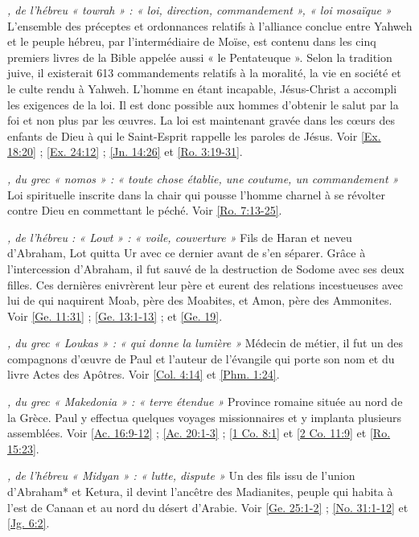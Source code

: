 \begin{multicols}{2}
\textit{, de l'hébreu « towrah » : « loi, direction, commandement », « loi mosaïque »}\newline
L'ensemble des préceptes et ordonnances relatifs à l'alliance conclue entre Yahweh et le peuple hébreu, par l'intermédiaire de Moïse, est contenu dans les cinq premiers livres de la Bible appelée aussi « le Pentateuque ». Selon la tradition juive, il existerait 613 commandements relatifs à la moralité, la vie en société et le culte rendu à Yahweh. L'homme en étant incapable, Jésus-Christ a accompli les exigences de la loi. Il est donc possible aux hommes d'obtenir le salut par la foi et non plus par les œuvres. La loi est maintenant gravée dans les cœurs des enfants de Dieu à qui le Saint-Esprit rappelle les paroles de Jésus. Voir \vref{Ex. 18:20} ; \vref{Ex. 24:12} ; \vref{Jn. 14:26} et \vref{Ro. 3:19-31}.

\textit{, du grec « nomos » : « toute chose établie, une coutume, un commandement »}\newline
Loi spirituelle inscrite dans la chair qui pousse l'homme charnel à se révolter contre Dieu en commettant le péché. Voir \vref{Ro. 7:13-25}.

\textit{, de l'hébreu : « Lowt » : « voile, couverture »}\newline
Fils de Haran et neveu d'Abraham, Lot quitta Ur avec ce dernier avant de s'en séparer. Grâce à l'intercession d'Abraham, il fut sauvé de la destruction de Sodome avec ses deux filles. Ces dernières enivrèrent leur père et eurent des relations incestueuses avec lui de qui naquirent Moab, père des Moabites, et Amon, père des Ammonites. Voir \vref{Ge. 11:31} ; \vref{Ge. 13:1-13} ; et \vref{Ge. 19}.

\textit{, du grec « Loukas » : « qui donne la lumière »}\newline
Médecin de métier, il fut un des compagnons d'œuvre de Paul et l'auteur de l'évangile qui porte son nom et du livre Actes des Apôtres. Voir \vref{Col. 4:14} et \vref{Phm. 1:24}.

\textit{, du grec « Makedonia » : « terre étendue »}\newline
Province romaine située au nord de la Grèce. Paul y effectua quelques voyages missionnaires et y implanta plusieurs assemblées. Voir \vref{Ac. 16:9-12} ; \vref{Ac. 20:1-3} ; \vref{1 Co. 8:1} et \vref{2 Co. 11:9} et \vref{Ro. 15:23}.

\textit{, de l'hébreu « Midyan » : « lutte, dispute »}\newline
Un des fils issu de l'union d'Abraham* et Ketura, il devint l'ancêtre des Madianites, peuple qui habita à l'est de Canaan et au nord du désert d'Arabie. Voir \vref{Ge. 25:1-2} ; \vref{No. 31:1-12} et \vref{Jg. 6:2}.


\end{multicols}
